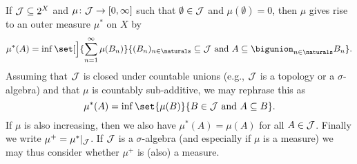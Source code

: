 \documentclass[article, a4paper, 11pt, oneside]{memoir}
\numberwithin{equation}{chapter}
\newcommand{\calB}{\mathcal{B}}
\newcommand{\borel}[1]{\calB(#1)}
\begin{document}
If $\mathcal{J} \subseteq 2^{X}$ and $\mu \colon \mathcal{J} \to [0,\infty]$ such that $\emptyset \in \mathcal{J}$ and $\mu(\emptyset) = 0$, then $\mu$ gives rise to an outer measure $\mu^*$ on $X$ by
%
\begin{equation*}
    \mu^*(A)
        = \inf \set[\Big]{
            \sum_{n=1}^\infty \mu(B_n)
        }{
            (B_n)_{n \in \naturals} \subseteq \calJ
            \text{ and }
            A \subseteq \bigunion_{n \in \naturals} B_n
        }.
\end{equation*}
%
Assuming that $\mathcal{J}$ is closed under countable unions (e.g., $\mathcal{J}$ is a topology or a $\sigma$-algebra) and that $\mu$ is countably sub-additive, we may rephrase this as
%
\begin{equation*}
    \mu^*(A)
        = \inf \set{
            \mu(B)
        }{
            B \in \calJ
            \text{ and }
            A \subseteq B
        }.
\end{equation*}
%
If $\mu$ is also increasing, then we also have $\mu^*(A) = \mu(A)$ for all $A \in \mathcal{J}$. Finally we write $\mu^+ = \mu^*|_{\mathcal{J}}$. If $\mathcal{J}$ is a $\sigma$-algebra (and especially if $\mu$ is a measure) we may thus consider whether $\mu^+$ is (also) a measure.





\end{document}
